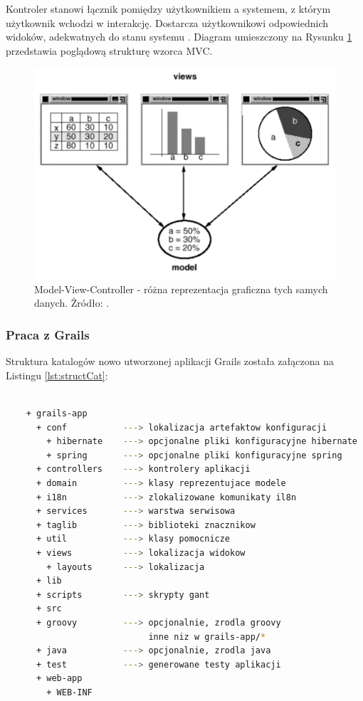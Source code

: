     Kontroler stanowi łącznik pomiędzy użytkownikiem a systemem, z którym użytkownik wchodzi w interakcję. Dostarcza użytkownikowi odpowiednich widoków, adekwatnych do stanu systemu \cite{Trygve79}. Diagram umieszczony na Rysunku \ref{fig:mvc-1} przedstawia poglądową strukturę wzorca MVC.

    \begin{figure}[t]
      \centering
      \includegraphics[width=1.0\textwidth]{img/mvc-1.pdf}
      \caption{Model-View-Controller - różna reprezentacja graficzna tych samych danych. Żródło: \cite{GoF}.}
      \label{fig:mvc-1}
    \end{figure}

    \subsubsection{Praca z Grails}

    Struktura katalogów nowo utworzonej aplikacji Grails została załączona na Listingu \ref{lst:structCat}:

    \begin{lstlisting}[language=sh,caption={Struktura katalogów Grails}, label={lst:structCat}]

    + grails-app
      + conf           ---> lokalizacja artefaktow konfiguracji
        + hibernate    ---> opcjonalne pliki konfiguracyjne hibernate
        + spring       ---> opcjonalne pliki konfiguracyjne spring 
      + controllers    ---> kontrolery aplikacji
      + domain         ---> klasy reprezentujace modele
      + i18n           ---> zlokalizowane komunikaty il8n
      + services       ---> warstwa serwisowa
      + taglib         ---> biblioteki znacznikow
      + util           ---> klasy pomocnicze 
      + views          ---> lokalizacja widokow
        + layouts      ---> lokalizacja 
      + lib
      + scripts        ---> skrypty gant
      + src
      + groovy         ---> opcjonalnie, zrodla groovy 
                            inne niz w grails-app/*
      + java           ---> opcjonalnie, zrodla java 
      + test           ---> generowane testy aplikacji
      + web-app
        + WEB-INF
    \end{lstlisting}

